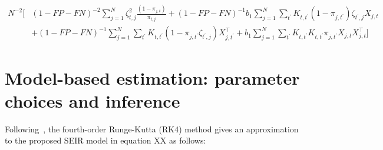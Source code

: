 \documentclass[12pt]{amsart}
\numberwithin{equation}{section}
\theoremstyle{plain}
\begin{document}
\begin{align*}
N^{-2} \bigg[ &(1-FP-FN)^{-2} \sum_{j=1}^N \zeta_{t,j}^2 \frac{(1-\pi_{j,t})}{\pi_{t,j}} + (1-FP-FN)^{-1} b_{1} \sum_{j=1}^N \sum_{t^\prime} K_{t,t^\prime} (1-\pi_{j,t^\prime}) \zeta_{t^\prime,j} X_{j,t} \\
&+ (1-FP-FN)^{-1} \sum_{j=1}^N \sum_{t^\prime} K_{t,t^\prime} (1-\pi_{j,t^\prime} \zeta_{t^\prime, j} ) X_{j,t^\prime}^\top + b_1 \sum_{j=1}^N \sum_{t^\prime} K_{t,t^\prime} K_{t,t^\prime} \pi_{j,t^\prime} X_{j,t} X_{j,t}^\top \bigg]
\end{align*}


\section{Model-based estimation: parameter choices and inference}
\label{app:modelbased}

Following~\cite{Song2020}, the fourth-order Runge-Kutta (RK4) method gives an approximation to the proposed SEIR model in equation XX as follows:
\end{document}
